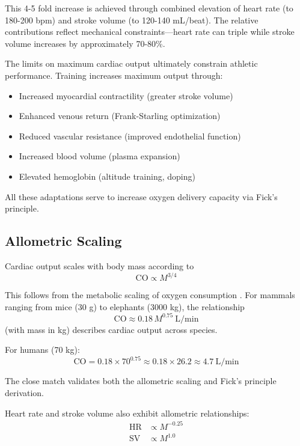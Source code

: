\documentclass[10pt,twocolumn,a4paper]{article}
\theoremstyle{remark}
\begin{document}
This 4-5 fold increase is achieved through combined elevation of heart rate (to 180-200 bpm) and stroke volume (to 120-140 mL/beat). The relative contributions reflect mechanical constraints—heart rate can triple while stroke volume increases by approximately 70-80\%.

The limits on maximum cardiac output ultimately constrain athletic performance. Training increases maximum output through:
\begin{itemize}
\item Increased myocardial contractility (greater stroke volume)
\item Enhanced venous return (Frank-Starling optimization)
\item Reduced vascular resistance (improved endothelial function)
\item Increased blood volume (plasma expansion)
\item Elevated hemoglobin (altitude training, doping)
\end{itemize}

All these adaptations serve to increase oxygen delivery capacity via Fick's principle.

\subsection{Allometric Scaling}

Cardiac output scales with body mass according to
\begin{equation}
\mathrm{CO} \propto M^{3/4}
\end{equation}

This follows from the metabolic scaling of oxygen consumption \cite{west1997general}. For mammals ranging from mice (30 g) to elephants (3000 kg), the relationship
\begin{equation}
\mathrm{CO} \approx 0.18 \, M^{0.75}~\mathrm{L/min}
\end{equation}
(with mass in kg) describes cardiac output across species.

For humans (70 kg):
\begin{equation}
\mathrm{CO} = 0.18 \times 70^{0.75} \approx 0.18 \times 26.2 \approx 4.7~\mathrm{L/min}
\end{equation}

The close match validates both the allometric scaling and Fick's principle derivation.

Heart rate and stroke volume also exhibit allometric relationships:
\begin{align}
\mathrm{HR} &\propto M^{-0.25} \\
\mathrm{SV} &\propto M^{1.0}
\end{align}
\end{document}
